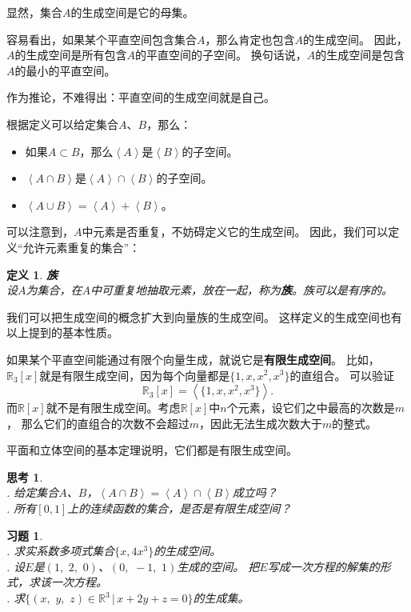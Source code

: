 \documentclass[12pt,UTF8]{ctexbook}
\newcommand{\vect}[1]{\left\langle #1 \right\rangle}
\newtheorem{df}{定义}[section]
\newtheorem{sk}{思考}[section]
\newtheorem{xt}{习题}[section]
\begin{document}
显然，集合$A$的生成空间是它的母集。

容易看出，如果某个平直空间包含集合$A$，那么肯定也包含$A$的生成空间。
因此，$A$的生成空间是所有包含$A$的平直空间的子空间。
换句话说，$A$的生成空间是包含$A$的最小的平直空间。

作为推论，不难得出：平直空间的生成空间就是自己。

根据定义可以给定集合$A$、$B$，那么：
\begin{itemize}
    \item 如果$A\subset B$，那么$\vect{A}$是$\vect{B}$的子空间。
    \item $\vect{A\cap B}$是$\vect{A}\cap\vect{B}$的子空间。
    \item $\vect{A\cup B} = \vect{A} + \vect{B}$。
\end{itemize}

可以注意到，$A$中元素是否重复，不妨碍定义它的生成空间。
因此，我们可以定义“允许元素重复的集合”：
\begin{df}{\textbf{族}}
    \mbox{} \\
    设$A$为集合，在$A$中可重复地抽取元素，放在一起，称为\textbf{族}。族可以是有序的。
\end{df}
我们可以把生成空间的概念扩大到向量族的生成空间。
这样定义的生成空间也有以上提到的基本性质。

如果某个平直空间能通过有限个向量生成，就说它是\textbf{有限生成空间}。
比如，$\mathbb{R}_3[x]$就是有限生成空间，因为每个向量都是$\{1, x, x^2, x^3\}$的直组合。
可以验证
$$\mathbb{R}_3[x] = \vect{\{1, x, x^2, x^3\}}.$$
而$\mathbb{R}[x]$就不是有限生成空间。考虑$\mathbb{R}[x]$中$n$个元素，设它们之中最高的次数是$m$，
那么它们的直组合的次数不会超过$m$，因此无法生成次数大于$m$的整式。

平面和立体空间的基本定理说明，它们都是有限生成空间。

\begin{sk}
    \mbox{} \\
    . 给定集合$A$、$B$，$\vect{A\cap B} = \vect{A}\cap\vect{B}$成立吗？\\
    . 所有$[0,1]$上的连续函数的集合，是否是有限生成空间？
\end{sk}

\begin{xt}
    \mbox{} \\
    . 求实系数多项式集合$\{x, 4x^3\}$的生成空间。\\
    . 设$E$是$(1, \,\,2, \,\,0)$、$(0, \,\,-1, \,\,1)$生成的空间。
    把$E$写成一次方程的解集的形式，求该一次方程。\\
    . 求$\{(x,\,\,y,\,\,z)\in\mathbb{R}^3 \, | \, x + 2y + z = 0 \}$的生成集。
    
\end{xt}
\end{document}
